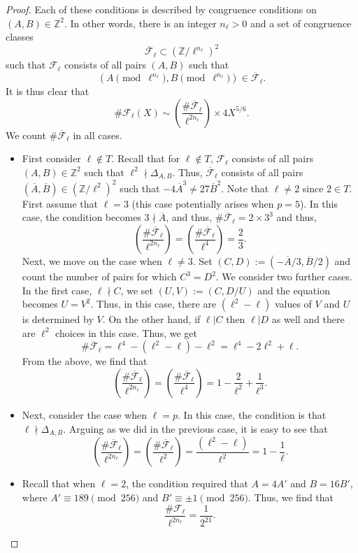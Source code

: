 \documentclass[12pt]{amsart}
\newcommand{\cF}{\mathcal{F}}
\newcommand{\Z}{\mathbb{Z}}
\numberwithin{equation}{section}
\begin{document}
\begin{proof}
    Each of these conditions is described by congruence conditions on $(A, B)\in \Z^2$. In other words, there is an integer $n_\ell>0$ and a set of congruence classes
    \[\overline{\cF}_\ell\subset (\Z/\ell^{n_\ell})^2\] such that $\cF_\ell$ consists of all pairs $(A,B)$ such that \[(A\pmod{\ell^{n_\ell}}, B\pmod{\ell^{n_\ell}})\in \overline{\cF}_\ell.\] It is thus clear that 
    \[\# \cF_\ell(X)\sim \left(\frac{\# \overline{\cF}_\ell}{\ell^{2n_\ell}}\right)\times 4 X^{5/6}.\] 
    We count $\# \overline{\cF}_\ell$ in all cases.
    \begin{itemize}
        \item First consider $\ell\notin T$. Recall that for $\ell\notin T$, $\cF_\ell$ consists of all pairs $(A,B)\in \Z^2$ such that $\ell^2\nmid \Delta_{A,B}$. Thus, $\overline{\cF}_\ell$ consists of all pairs $(\overline{A}, \overline{B})\in (\Z/\ell^2)^2$ such that $-4 \overline{A}^3\neq 27 \overline{B}^2$. Note that $\ell\neq 2$ since $2\in T$. First assume that $\ell=3$ (this case potentially arises when $p=5$). In this case, the condition becomes $3\nmid \overline{A}$, and thus, $\# \overline{\cF}_\ell=2\times 3^3$ and thus, 
        \[\left(\frac{\# \overline{\cF}_\ell}{\ell^{2n_\ell}}\right)=\left(\frac{\# \overline{\cF}_\ell}{\ell^{4}}\right)=\frac{2}{3}.\]
        Next, we move on the case when $\ell\neq 3$. Set $(C,D):=(-\overline{A}/3,\overline{B}/2)$ and count the number of pairs for which $C^3= D^2$. We consider two further cases. In the first case, $\ell\nmid C$, we set $(U,V):=(C, D/U)$ and the equation becomes $U=V^2$. Thus, in this case, there are $(\ell^2-\ell)$ values of $V$ and $U$ is determined by $V$. On the other hand, if $\ell|C$ then $\ell| D$ as well and there are $\ell^2$ choices in this case. Thus, we get 
        \[\#\overline{\cF}_\ell=\ell^4-(\ell^2-\ell)-\ell^2=\ell^4-2\ell^2+\ell.\]
        From the above, we find that 
        \[\left(\frac{\# \overline{\cF}_\ell}{\ell^{2n_\ell}}\right)=\left(\frac{\# \overline{\cF}_\ell}{\ell^{4}}\right)=1-\frac{2}{\ell^2}+\frac{1}{\ell^3}.\]
        \item Next, consider the case when $\ell=p$. In this case, the condition is that $\ell\nmid \Delta_{A,B}$. Arguing as we did in the previous case, it is easy to see that 
        \[\left(\frac{\# \overline{\cF}_\ell}{\ell^{2n_\ell}}\right)=\left(\frac{\# \overline{\cF}_\ell}{\ell^{2}}\right)=\frac{(\ell^2-\ell)}{\ell^2}=1-\frac{1}{\ell}.\]
        \item Recall that when $\ell=2$, the condition required that $A=4A'$ and $B=16B'$, where $A' \equiv 189 \pmod{256}$ and $B' \equiv \pm 1 \pmod{256}$. Thus, we find that
\[\frac{\# \cF_\ell}{\ell^{2n_\ell}}=\frac{1}{2^{21}}.\]
    \end{itemize}
\end{proof}
\end{document}
